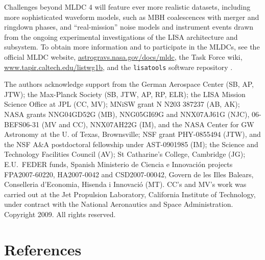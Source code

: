 \documentclass{iopart}
\begin{document}
Challenges beyond MLDC 4 will feature ever more realistic datasets, including more sophisticated waveform models, such as MBH coalescences with merger and ringdown phases, and ``real-mission'' noise models and instrument events drawn from the ongoing experimental investigations of the LISA architecture and subsystem. To obtain more information and to participate in the MLDCs, see the official MLDC website, \url{astrogravs.nasa.gov/docs/mldc}, the Task Force wiki, \url{www.tapir.caltech.edu/listwg1b}, and the \texttt{lisatools} software repository \cite{lisatools}.


\ack The authors acknowledge support from
the German Aerospace Center (SB, AP, JTW);
the Max-Planck Society (SB, JTW, AP, RP, ELR);
the LISA Mission Science Office at JPL (CC, MV);
MNiSW grant N N203 387237 (AB, AK);
NASA grants NNG04GD52G (MB),
  NNG05GI69G and NNX07AJ61G (NJC),
  06-BEFS06-31 (MV and CC),
  NNX07AH22G (IM),
  and the NASA Center for GW Astronomy at the U. of Texas, Brownsville;
NSF grant PHY-0855494 (JTW),
  and the NSF A\&A postdoctoral fellowship under AST-0901985 (IM);
the Science and Technology Facilities Council (AV);
St Catharine's College, Cambridge (JG);
E.U.\ FEDER funds, Spanish Ministerio de Ciencia e Innovaci\'on projects FPA2007-60220, HA2007-0042 and CSD2007-00042, Govern de les Illes Balears, Conselleria d'Economia, Hisenda i Innovaci\'o (MT).
CC's and MV's work was carried out at the Jet Propulsion Laboratory, California Institute of Technology, under contract with the National Aeronautics and Space Administration. Copyright 2009. All rights reserved.

\section*{References}
\end{document}
